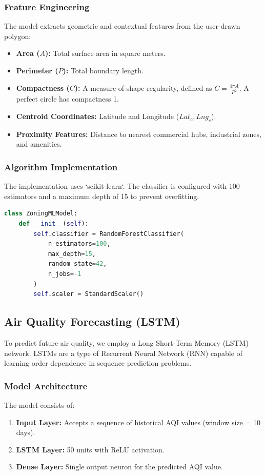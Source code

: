 \documentclass[12pt,a4paper]{report}
\begin{document}
\subsubsection{Feature Engineering}
The model extracts geometric and contextual features from the user-drawn polygon:
\begin{itemize}
    \item \textbf{Area ($A$):} Total surface area in square meters.
    \item \textbf{Perimeter ($P$):} Total boundary length.
    \item \textbf{Compactness ($C$):} A measure of shape regularity, defined as $C = \frac{4\pi A}{P^2}$. A perfect circle has compactness 1.
    \item \textbf{Centroid Coordinates:} Latitude and Longitude ($Lat_c, Lng_c$).
    \item \textbf{Proximity Features:} Distance to nearest commercial hubs, industrial zones, and amenities.
\end{itemize}

\subsubsection{Algorithm Implementation}
The implementation uses `scikit-learn`. The classifier is configured with 100 estimators and a maximum depth of 15 to prevent overfitting.

\begin{lstlisting}[language=Python, caption=Random Forest Initialization]
class ZoningMLModel:
    def __init__(self):
        self.classifier = RandomForestClassifier(
            n_estimators=100,
            max_depth=15,
            random_state=42,
            n_jobs=-1
        )
        self.scaler = StandardScaler()
\end{lstlisting}

\subsection{Air Quality Forecasting (LSTM)}
To predict future air quality, we employ a Long Short-Term Memory (LSTM) network. LSTMs are a type of Recurrent Neural Network (RNN) capable of learning order dependence in sequence prediction problems.

\subsubsection{Model Architecture}
The model consists of:
\begin{enumerate}
    \item \textbf{Input Layer:} Accepts a sequence of historical AQI values (window size = 10 days).
    \item \textbf{LSTM Layer:} 50 units with ReLU activation.
    \item \textbf{Dense Layer:} Single output neuron for the predicted AQI value.
\end{enumerate}
\end{document}
